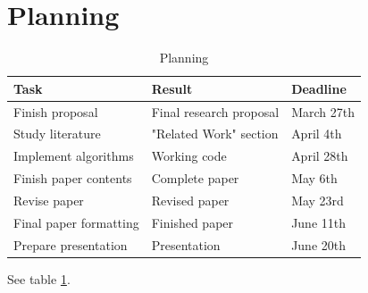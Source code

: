 \documentclass{acm_proc_article-sp}
\begin{document}
\section{Planning}
\begin{table}
\begin{center}
\begin{tabular}{ | l | l | l | }
\hline
\textbf{Task} & \textbf{Result} & \textbf{Deadline} \\
\hline
Finish proposal
    & Final research proposal
    & March 27th \\
Study literature
    & "Related Work" section
    & April 4th \\
Implement algorithms
    & Working code
    & April 28th \\
Finish paper contents
    & Complete paper
    & May 6th \\
Revise paper
    & Revised paper
    & May 23rd \\
Final paper formatting
    & Finished paper
    & June 11th \\
Prepare presentation
    & Presentation
    & June 20th \\
\hline
\end{tabular}
\caption{Planning}
\label{tab-planning}
\end{center}
\end{table}
See table \ref{tab-planning}.



\end{document}
